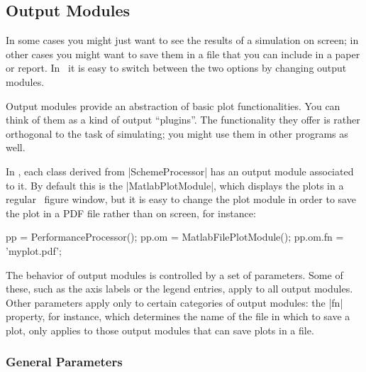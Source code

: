 \subsection{Output Modules}

In some cases you might just want to see the results of a simulation on screen;
in other cases you might want to save them in a file that you can include in a
paper or report. In \jscsim\ it is easy to switch between the two options by
changing output modules.

Output modules provide an abstraction of basic plot functionalities. You can
think of them as a kind of output ``plugins''. The functionality they offer is
rather orthogonal to the task of simulating; you might use them in other
programs as well. 

In \jscsim, each class derived from |SchemeProcessor| has an output module
associated to it. By default this is the |MatlabPlotModule|, which displays the
plots in a regular \matlab\ figure window, but it is easy to change the plot
module in order to save the plot in a PDF file rather than on screen, for
instance:
\begin{Code}
  pp = PerformanceProcessor();
  pp.om = MatlabFilePlotModule();
  pp.om.fn = 'myplot.pdf';
\end{Code}

The behavior of output modules is controlled by a set of parameters. Some of
these, such as the axis labels or the legend entries, apply to all
output modules. Other parameters apply only to certain categories of output
modules: the |fn| property, for instance, which determines the name of the file
in which to save a plot, only applies to those output modules that can save
plots in a file. 


\subsubsection{General Parameters}

